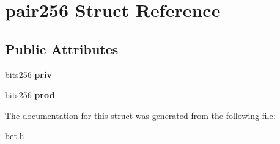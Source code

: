 \hypertarget{structpair256}{}\section{pair256 Struct Reference}
\label{structpair256}
\subsection*{Public Attributes}
\begin{DoxyCompactItemize}
\item 
\mbox{\label{structpair256_a08e3b8e0e895b13eebc705b35e6113aa}} 
bits256 {\bfseries priv}
\item 
\mbox{\label{structpair256_a3d40c38f9e09a72c32f584c783528c7a}} 
bits256 {\bfseries prod}
\end{DoxyCompactItemize}


The documentation for this struct was generated from the following file\+:\begin{DoxyCompactItemize}
\item 
bet.\+h\end{DoxyCompactItemize}
